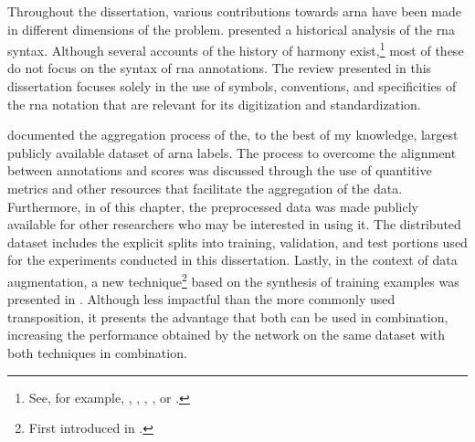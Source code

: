 
Throughout the dissertation, various contributions towards
\gls{arna} have been made in different dimensions of the
problem. 
presented a historical analysis of the \gls{rna} syntax.
Although several accounts of the history of harmony
exist,\footnote{See, for example,
\textcite{wason1985viennese}, \textcite{grave1988praise},
\textcite{christensen2002tonality},
\textcite{laitz2010graduate}, or
\textcite{sansallovich2013quintas}.} most of these do not
focus on the syntax of \gls{rna} annotations. The review
presented in this dissertation focuses solely in the use of
symbols, conventions, and specificities of the \gls{rna}
notation that are relevant for its digitization and
standardization.

 documented the
aggregation process of the, to the best of my knowledge,
largest publicly available dataset of \gls{arna} labels. The
process to overcome the alignment between annotations and
scores was discussed through the use of quantitive metrics
and other resources that facilitate the aggregation of the
data. Furthermore, in  of this
chapter, the preprocessed data was made publicly available
for other researchers who may be interested in using it. The
distributed dataset includes the explicit splits into
training, validation, and test portions used for the
experiments conducted in this dissertation. Lastly, in the
context of data augmentation, a new technique\footnote{First
introduced in \textcite{napoleslopez2021augmentednet}.}
based on the synthesis of training examples was presented in
. Although
less impactful than the more commonly used transposition, it
presents the advantage that both can be used in combination,
increasing the performance obtained by the network on the
same dataset with both techniques in combination.


